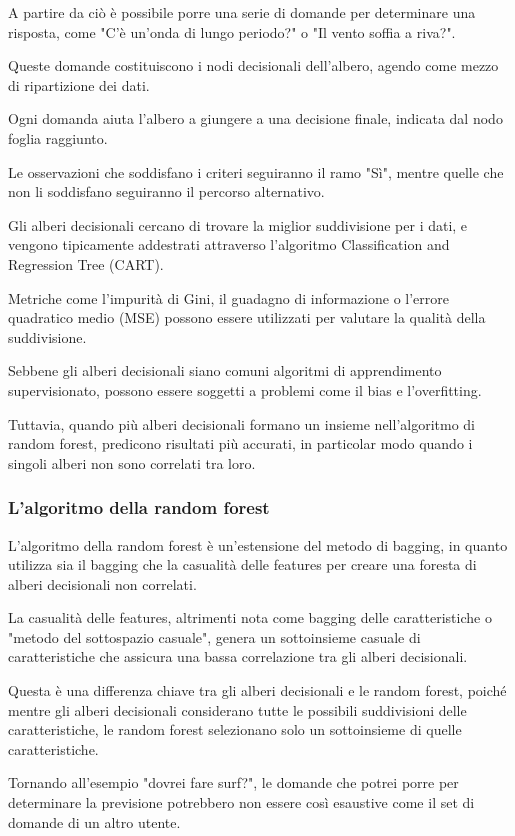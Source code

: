 A partire da ciò è possibile porre una serie di domande per determinare una risposta, come "C'è un'onda di lungo periodo?" o "Il vento soffia a riva?". 

Queste domande costituiscono i nodi decisionali dell'albero, agendo come mezzo di ripartizione dei dati.

Ogni domanda aiuta l’albero a giungere a una decisione finale, indicata dal nodo foglia raggiunto. 

Le osservazioni che soddisfano i criteri seguiranno il ramo "Sì", mentre quelle che non li soddisfano seguiranno il percorso alternativo. 

Gli alberi decisionali cercano di trovare la miglior suddivisione per i dati, e vengono tipicamente addestrati attraverso l'algoritmo Classification and Regression Tree (CART). 

Metriche come l'impurità di Gini, il guadagno di informazione o l'errore quadratico medio (MSE) possono essere utilizzati per valutare la qualità della suddivisione.

Sebbene gli alberi decisionali siano comuni algoritmi di apprendimento supervisionato, possono essere soggetti a problemi come il bias e l'overfitting. 

Tuttavia, quando più alberi decisionali formano un insieme nell'algoritmo di random forest, predicono risultati più accurati, in particolar modo quando i singoli alberi non sono correlati tra loro.

\subsubsection{L'algoritmo della random forest}
L'algoritmo della random forest è un'estensione del metodo di bagging, in quanto utilizza sia il bagging che la casualità delle features per creare una foresta di alberi decisionali non correlati. 

La casualità delle features, altrimenti nota come bagging delle caratteristiche o "metodo del sottospazio casuale", genera un sottoinsieme casuale di caratteristiche che assicura una bassa correlazione tra gli alberi decisionali. 

Questa è una differenza chiave tra gli alberi decisionali e le random forest, poiché mentre gli alberi decisionali considerano tutte le possibili suddivisioni delle caratteristiche, le random forest selezionano solo un sottoinsieme di quelle caratteristiche.

Tornando all'esempio "dovrei fare surf?", le domande che potrei porre per determinare la previsione potrebbero non essere così esaustive come il set di domande di un altro utente. 

